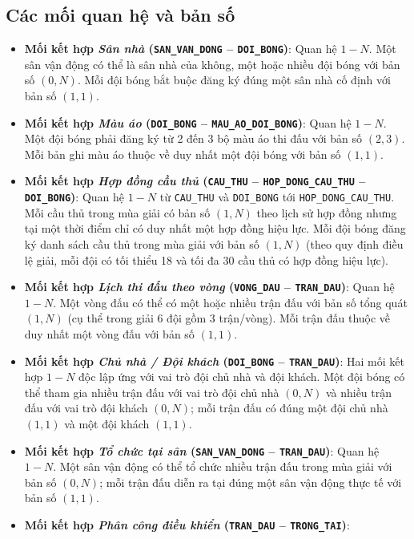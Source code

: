 \subsection{Các mối quan hệ và bản số}
\begin{itemize}
    \item \textbf{Mối kết hợp \textit{Sân nhà} (\texttt{SAN\_VAN\_DONG} -- \texttt{DOI\_BONG})}:
    Quan hệ $1 - N$. Một sân vận động có thể là sân nhà của không, một hoặc nhiều đội bóng với bản số $(0, N)$. Mỗi đội bóng bắt buộc đăng ký đúng một sân nhà cố định với bản số $(1, 1)$.
    \item \textbf{Mối kết hợp \textit{Màu áo} (\texttt{DOI\_BONG} -- \texttt{MAU\_AO\_DOI\_BONG})}:
    Quan hệ $1 - N$. Một đội bóng phải đăng ký từ 2 đến 3 bộ màu áo thi đấu với bản số $(2, 3)$. Mỗi bản ghi màu áo thuộc về duy nhất một đội bóng với bản số $(1, 1)$.
    \item \textbf{Mối kết hợp \textit{Hợp đồng cầu thủ} (\texttt{CAU\_THU} -- \texttt{HOP\_DONG\_CAU\_THU} -- \texttt{DOI\_BONG})}:
    Quan hệ $1 - N$ từ \texttt{CAU\_THU} và \texttt{DOI\_BONG} tới \texttt{HOP\_DONG\_CAU\_THU}. Mỗi cầu thủ trong mùa giải có bản số $(1, N)$ theo lịch sử hợp đồng nhưng tại một thời điểm chỉ có duy nhất một hợp đồng hiệu lực. Mỗi đội bóng đăng ký danh sách cầu thủ trong mùa giải với bản số $(1, N)$ (theo quy định điều lệ giải, mỗi đội có tối thiểu 18 và tối đa 30 cầu thủ có hợp đồng hiệu lực).
    \item \textbf{Mối kết hợp \textit{Lịch thi đấu theo vòng} (\texttt{VONG\_DAU} -- \texttt{TRAN\_DAU})}:
    Quan hệ $1 - N$. Một vòng đấu có thể có một hoặc nhiều trận đấu với bản số tổng quát $(1, N)$ (cụ thể trong giải 6 đội gồm 3 trận/vòng). Mỗi trận đấu thuộc về duy nhất một vòng đấu với bản số $(1, 1)$.
    \item \textbf{Mối kết hợp \textit{Chủ nhà / Đội khách} (\texttt{DOI\_BONG} -- \texttt{TRAN\_DAU})}:
    Hai mối kết hợp $1 - N$ độc lập ứng với vai trò đội chủ nhà và đội khách. Một đội bóng có thể tham gia nhiều trận đấu với vai trò đội chủ nhà $(0, N)$ và nhiều trận đấu với vai trò đội khách $(0, N)$; mỗi trận đấu có đúng một đội chủ nhà $(1, 1)$ và một đội khách $(1, 1)$.
    \item \textbf{Mối kết hợp \textit{Tổ chức tại sân} (\texttt{SAN\_VAN\_DONG} -- \texttt{TRAN\_DAU})}:
    Quan hệ $1 - N$. Một sân vận động có thể tổ chức nhiều trận đấu trong mùa giải với bản số $(0, N)$; mỗi trận đấu diễn ra tại đúng một sân vận động thực tế với bản số $(1, 1)$.
    \item \textbf{Mối kết hợp \textit{Phân công điều khiển} (\texttt{TRAN\_DAU} -- \texttt{TRONG\_TAI})}:

\end{itemize}
